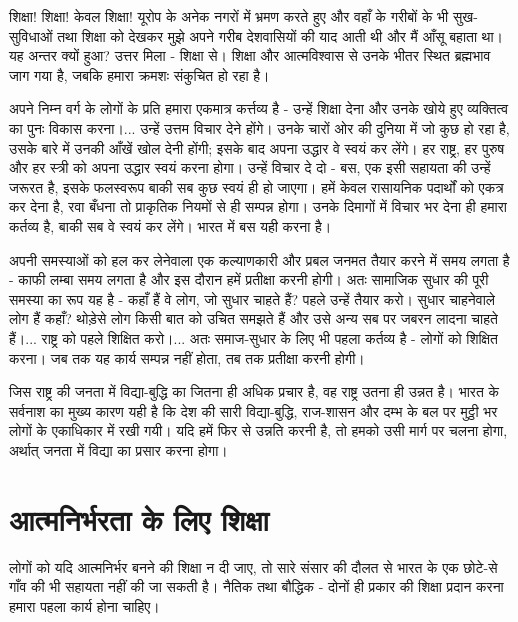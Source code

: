 
शिक्षा! शिक्षा! केवल शिक्षा! यूरोप के अनेक नगरों में भ्रमण करते हुए और वहाँ के गरीबों के भी सुख-सुविधाओं तथा शिक्षा को देखकर मुझे अपने गरीब देशवासियों की याद आती थी और मैं आँसू बहाता था। यह अन्तर क्यों हुआ? उत्तर मिला - शिक्षा से। शिक्षा और आत्मविश्वास से उनके भीतर स्थित ब्रह्मभाव जाग गया है, जबकि हमारा क्रमशः संकुचित हो रहा है। 

अपने निम्न वर्ग के लोगों के प्रति हमारा एकमात्र कर्त्तव्य है - उन्हें शिक्षा देना और उनके खोये हुए व्यक्तित्व का पुनः विकास करना।... उन्हें उत्तम विचार देने होंगे। उनके चारों ओर की दुनिया में जो कुछ हो रहा है, उसके बारे में उनकी आँखें खोल देनी होंगी; इसके बाद अपना उद्धार वे स्वयं कर लेंगे। हर राष्ट्र, हर पुरुष और हर स्त्री को अपना उद्धार स्वयं करना होगा। उन्हें विचार दे दो - बस, एक इसी सहायता की उन्हें जरूरत है, इसके फलस्वरूप बाकी सब कुछ स्वयं ही हो जाएगा। हमें केवल रासायनिक पदार्थों को एकत्र कर देना है, रवा बँधना तो प्राकृतिक नियमों से ही सम्पन्न होगा। उनके दिमागों में विचार भर देना ही हमारा कर्तव्य है, बाकी सब वे स्वयं कर लेंगे। भारत में बस यही करना है। 

अपनी समस्याओं को हल कर लेनेवाला एक कल्याणकारी और प्रबल जनमत तैयार करने में समय लगता है - काफी लम्बा समय लगता है और इस दौरान हमें प्रतीक्षा करनी होगी। अतः सामाजिक सुधार की पूरी समस्या का रूप यह है - कहाँ हैं वे लोग, जो सुधार चाहते हैं? पहले उन्हें तैयार करो। सुधार चाहनेवाले लोग हैं कहाँ? थोड़ेसे लोग किसी बात को उचित समझते हैं और उसे अन्य सब पर जबरन लादना चाहते हैं।... राष्ट्र को पहले शिक्षित करो।... अतः समाज-सुधार के लिए भी पहला कर्तव्य है - लोगों को शिक्षित करना। जब तक यह कार्य सम्पन्न नहीं होता, तब तक प्रतीक्षा करनी होगी। 

जिस राष्ट्र की जनता में विद्या-बुद्धि का जितना ही अधिक प्रचार है, वह राष्ट्र उतना ही उन्नत है। भारत के सर्वनाश का मुख्य कारण यही है कि देश की सारी विद्या-बुद्धि, राज-शासन और दम्भ के बल पर मुट्ठी भर लोगों के एकाधिकार में रखी गयी। यदि हमें फिर से उन्नति करनी है, तो हमको उसी मार्ग पर चलना होगा, अर्थात् जनता में विद्या का प्रसार करना होगा।


\section*{आत्मनिर्भरता के लिए शिक्षा}


लोगों को यदि आत्मनिर्भर बनने की शिक्षा न दी जाए, तो सारे संसार की दौलत से भारत के एक छोटे-से गाँव की भी सहायता नहीं की जा सकती है। नैतिक तथा बौद्धिक - दोनों ही प्रकार की शिक्षा प्रदान करना हमारा पहला कार्य होना चाहिए।


